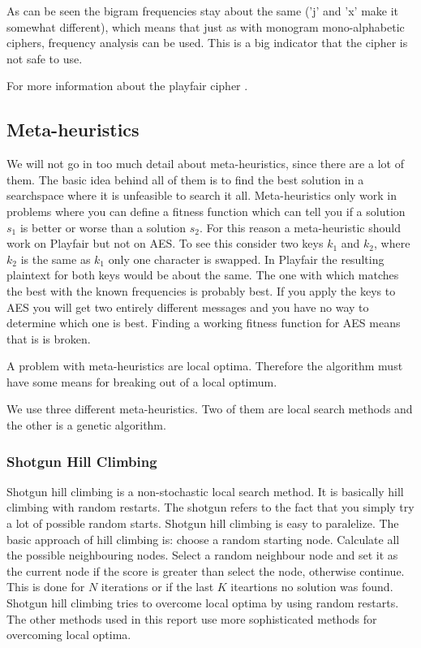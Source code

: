 \documentclass[]{article}
\begin{document}
As can be seen the bigram frequencies stay about the same ('j' and 'x' make it somewhat different), which
means that just as with monogram mono-alphabetic ciphers, frequency analysis can be used. This is a big indicator that the cipher is not safe to use.

For more information about the playfair cipher \cite{?}.
\subsection{Meta-heuristics}
We will not go in too much detail about meta-heuristics, since there are a lot of them. The basic idea behind all of them is to find the best solution in a searchspace where it is unfeasible to search it all. Meta-heuristics only work in problems where you can define a fitness function which can tell you if a solution $s_1$ is better or worse than a solution $s_2$. For this reason a meta-heuristic should work on Playfair but not on AES. To see this consider two keys $k_1$ and $k_2$, where $k_2$ is the same as $k_1$ only one character is swapped. In Playfair the resulting plaintext for both keys would be about the same. The one with which matches the best with the known frequencies is probably best. If you apply the keys to AES you will get two entirely different messages and you have no way to determine which one is best. Finding a working fitness function for AES means that is is broken.

A problem with meta-heuristics are local optima. Therefore the algorithm must have some means for breaking out of a local optimum.

We use three different meta-heuristics. Two of them are local search methods and the other is a genetic algorithm. 
\subsubsection{Shotgun Hill Climbing}
Shotgun hill climbing is a non-stochastic local search method. It is basically hill climbing with random restarts. The shotgun refers to the fact that you simply try a lot of possible random starts. Shotgun hill climbing is easy to paralelize. The basic approach of hill climbing is: choose a random starting node. Calculate all the possible neighbouring nodes. Select a random neighbour node and set it as the current node if the score is greater than select the node, otherwise continue. This is done for $N$ iterations or if the last $K$ iteartions no solution was found. Shotgun hill climbing tries to overcome local optima by using random restarts. The other methods used in this report use more sophisticated methods for overcoming local optima.
\end{document}
